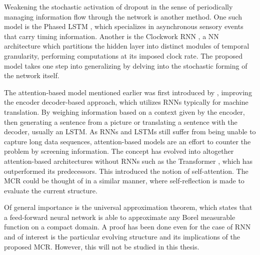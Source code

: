 Weakening the stochastic activation of dropout in the sense of periodically managing information flow through the network is another method. One such model is the Phased LSTM \cite{phaselstm}, which specializes in asynchronous sensory events that carry timing information. Another is the Clockwork RNN \cite{Clockwork}, a NN architecture which partitions the hidden layer into distinct modules of temporal granularity, performing computations at its imposed clock rate. The proposed model takes one step into generalizing by delving into the stochastic forming of the network itself.

The attention-based model mentioned earlier was first introduced by \textcite{att}, improving the encoder decoder-based approach, which utilizes RNNs typically for machine translation. By weighing information based on a context given by the encoder, then generating a sentence from a picture or translating a sentence with the decoder, usually an LSTM. As RNNs and LSTMs still suffer from being unable to capture long data sequences, attention-based models are an effort to counter the problem by screening information. The concept has evolved into altogether attention-based architectures without RNNs such as the Transformer \cite{trans}, which has outperformed its predecessors. This introduced the notion of self-attention. The MCR could be thought of in a similar manner, where self-reflection is made to evaluate the current structure. 

Of general importance is the universal approximation theorem, which states that a feed-forward neural network is able to approximate any Borel measurable function on a compact domain. A proof has been done even for the case of RNN \cite{uarnn} and of interest is the particular evolving structure and its implications of the proposed MCR. However, this will not be studied in this thesis.

